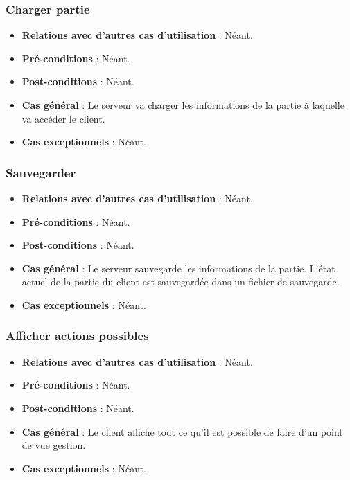 \documentclass[a4paper,titlepage]{scrreprt}
\begin{document}
    \subsubsection{Charger partie}
      \begin{itemize}
        \item \textbf{Relations avec d'autres cas d'utilisation}  : Néant.
        \item \textbf{Pré-conditions} : Néant.
        \item \textbf{Post-conditions} : Néant.
        \item \textbf{Cas général} : Le serveur va charger les informations de la partie à laquelle va accéder le client.
        \item \textbf{Cas exceptionnels} : Néant.
      \end{itemize}
    \subsubsection{Sauvegarder}
      \begin{itemize}
        \item \textbf{Relations avec d'autres cas d'utilisation}  : Néant.
        \item \textbf{Pré-conditions} : Néant.
        \item \textbf{Post-conditions} : Néant.
        \item \textbf{Cas général} : Le serveur sauvegarde les informations de la partie. L’état actuel de la partie du client est sauvegardée dans un fichier de sauvegarde.
        \item \textbf{Cas exceptionnels} : Néant.
      \end{itemize}
    \subsubsection{Afficher actions possibles}
      \begin{itemize}
        \item \textbf{Relations avec d'autres cas d'utilisation}  : Néant.
        \item \textbf{Pré-conditions} : Néant.
        \item \textbf{Post-conditions} : Néant.
        \item \textbf{Cas général} : Le client affiche tout ce qu’il est possible de faire d’un point de vue gestion.
        \item \textbf{Cas exceptionnels} : Néant.
      \end{itemize}
\end{document}
